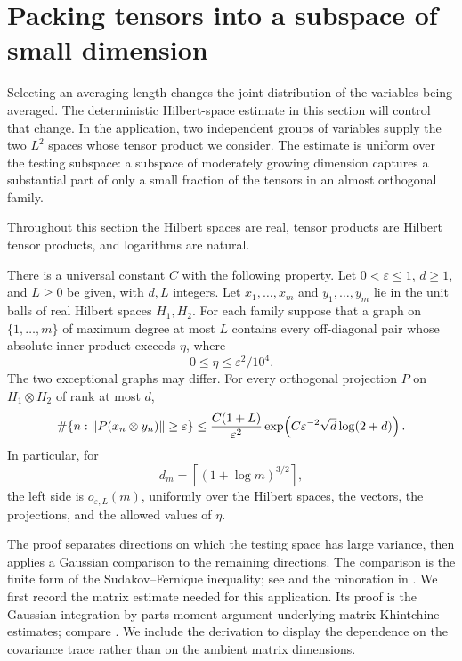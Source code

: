 \section{Packing tensors into a subspace of small dimension}
\label{sec:packing}

Selecting an averaging length changes the joint distribution of the
variables being averaged.  The deterministic Hilbert-space estimate in
this section will control that change.  In the application, two independent
groups of variables supply the two $L^2$ spaces whose tensor product we
consider.  The estimate is uniform over the testing subspace: a subspace
of moderately growing dimension captures a substantial part of only a
small fraction of the tensors in an almost orthogonal family.

Throughout this section the Hilbert spaces are real, tensor products are
Hilbert tensor products, and logarithms are natural.

\begin{theorem}\label{thm:packing}
There is a universal constant $C$ with the following property.  Let
$0<\varepsilon\le1$, $d\ge1$, and $L\ge0$ be given, with $d,L$ integers.
Let $x_1,\ldots,x_m$ and $y_1,\ldots,y_m$ lie in the unit balls of real
Hilbert spaces $H_1,H_2$.  For each family suppose that a graph on
$\{1,\ldots,m\}$ of maximum degree at most $L$ contains every off-diagonal
pair whose absolute inner product exceeds $\eta$, where
\[
                         0\le\eta\le\varepsilon^2/10^4.
\]
The two exceptional graphs may differ.  For every orthogonal projection
$P$ on $H_1\otimes H_2$ of rank at most $d$,
\begin{equation}\label{eq:packing-quantitative}
 \#\{n:\lVert P(x_n\otimes y_n)\rVert\ge\varepsilon\}
 \le \frac{C(1+L)}{\varepsilon^2}
       \exp\!\left(C\varepsilon^{-2}\sqrt d\log(2+d)\right).
\end{equation}
In particular, for
\begin{equation}\label{eq:packing-dimension}
                  d_m=\left\lceil(1+\log m)^{3/2}\right\rceil,
\end{equation}
the left side is $o_{\varepsilon,L}(m)$, uniformly over the Hilbert
spaces, the vectors, the projections, and the allowed values of $\eta$.
\end{theorem}

The proof separates directions on which the testing space has large
variance, then applies a Gaussian comparison to the remaining directions.
The comparison is the finite form of the Sudakov--Fernique inequality;
see \cite[Section~1, Equation~(1.2)]{Fernique} and the minoration in
\cite{Sudakov}.  We first record the matrix estimate needed for this
application.  Its proof is the Gaussian integration-by-parts moment
argument underlying matrix Khintchine estimates; compare
\cite[Lemma~6.1 and Proposition~7.3]{Tropp}.  We include the derivation
to display the dependence on the covariance trace rather than on the
ambient matrix dimensions.

